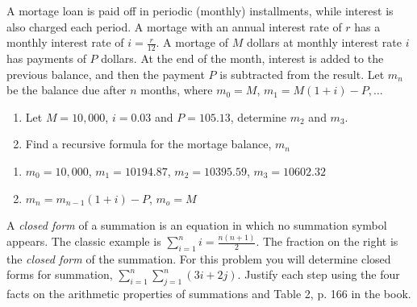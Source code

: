 \documentclass[11pt,addpoints]{exam}
\begin{document}
\begin{questions}
\question[8] A mortage loan is paid off in periodic (monthly) installments, while interest is also charged each period.  A mortage with an annual interest rate of $r$ has a monthly interest rate of $i = \frac{r}{12}$.  A mortage of $M$ dollars at monthly interest rate $i$ has payments of $P$ dollars.  At the end of the month, interest is added to the previous balance, and then the payment $P$ is subtracted from the result.  Let $m_n$ be the balance due after $n$ months, where $m_0 = M$, $m_1 = M(1+i) - P, \ldots$
\begin{enumerate}[label=(\alph*),itemsep=0pt,parsep=0pt,
    topsep=0pt,partopsep=0pt]
    \item Let $M = 10,000$, $i = 0.03$ and $P = 105.13$, determine $m_2$ and $m_3$.
    \item Find a recursive formula for the mortage balance, $m_n$
\end{enumerate}
    \ifprintanswers
        \vspace{-10pt}
   \fi
\begin{solution}
	\begin{enumerate}[label=(\alph*),itemsep=0pt,parsep=0pt,
    topsep=0pt,partopsep=0pt]
    	\item $m_0 = 10,000$, $m_1 = 10194.87$, $m_2 = 10395.59$, $m_3 =  10602.32$
    	\item $m_n = m_{n-1}(1+i) - P$, $m_o = M$
    \end{enumerate}
\end{solution}


\question[10] A \textit{closed form} of a summation is an equation
in which no summation symbol appears.  The classic example is
$\displaystyle \sum_{i=1}^n i = \frac{n(n+1)}{2}$.  The fraction on
the right is the \textit{closed form} of the summation.  For this
problem you will determine closed forms for summation, $\displaystyle \sum_{i=1}^n \sum_{j=1}^n (3i+ 2j)$.  Justify each step using the four facts on the arithmetic properties of summations and Table 2, p. 166 in the book.


\end{questions}
\end{document}
